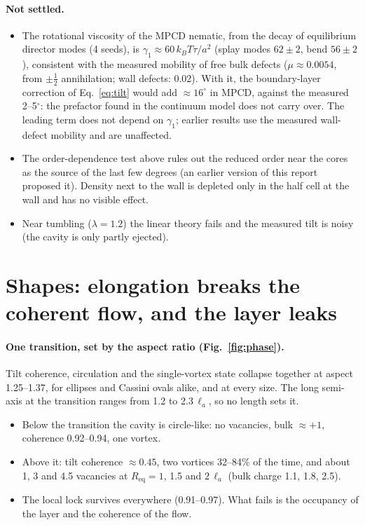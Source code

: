 \documentclass[11pt,a4paper]{article}
\newcommand{\half}{\tfrac12}
\newcommand{\la}{\ell_a}
\newcommand{\kT}{k_BT}
\begin{document}
\paragraph{Not settled.}
\begin{itemize}
  \item The rotational viscosity of the MPCD nematic, from the decay of equilibrium director modes (4 seeds), is $\gamma_1\approx60\,\kT\tau/a^2$ (splay modes $62\pm2$, bend $56\pm2$),
        consistent with the measured mobility of free bulk defects ($\mu\approx0.0054$, from $\pm\half$ annihilation; wall defects: 0.02). With it, the boundary-layer correction of
        Eq.~\eqref{eq:tilt} would add $\approx16^\circ$ in MPCD, against the measured 2--5$^\circ$: the prefactor found in the continuum model does not carry over. The leading term does
        not depend on $\gamma_1$; earlier results use the measured wall-defect mobility and are unaffected.
  \item The order-dependence test above rules out the reduced order near the cores as the source of the last few degrees (an earlier version of this report proposed it).
        Density next to the wall is depleted only in the half cell at the wall and has no visible effect.
  \item Near tumbling ($\lambda=1.2$) the linear theory fails and the measured tilt is noisy (the cavity is only partly ejected).
\end{itemize}

\section{Shapes: elongation breaks the coherent flow, and the layer leaks}\label{sec:shapes}
\paragraph{One transition, set by the aspect ratio (Fig.~\ref{fig:phase}).} Tilt coherence, circulation and the single-vortex state collapse together at aspect
1.25--1.37, for ellipses and Cassini ovals alike, and at every size. The long semi-axis at the transition ranges from 1.2 to 2.3\,$\la$, so no length sets it.
\begin{itemize}
  \item Below the transition the cavity is circle-like: no vacancies, bulk $\approx+1$, coherence 0.92--0.94, one vortex.
  \item Above it: tilt coherence $\approx0.45$, two vortices 32--84\% of the time, and about 1, 3 and 4.5 vacancies at $R_\mathrm{eq}=1$, 1.5 and $2\,\la$
        (bulk charge 1.1, 1.8, 2.5).
  \item The local lock survives everywhere (0.91--0.97). What fails is the occupancy of the layer and the coherence of the flow.
\end{itemize}
\end{document}
